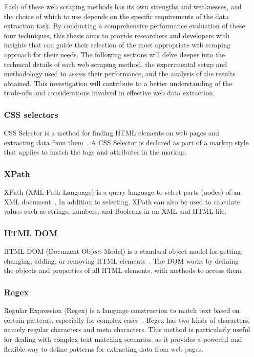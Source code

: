 Each of these web scraping methods has its own strengths and weaknesses, and the choice of which to use depends on the specific requirements of the data extraction task. By conducting a comprehensive performance evaluation of these four techniques, this thesis aims to provide researchers and developers with insights that can guide their selection of the most appropriate web scraping approach for their needs.
The following sections will delve deeper into the technical details of each web scraping method, the experimental setup and methodology used to assess their performance, and the analysis of the results obtained. This investigation will contribute to a better understanding of the trade-offs and considerations involved in effective web data extraction.
\subsubsection{CSS selectors}
CSS Selector is a method for finding HTML elements on web pages and extracting data from them~\cite{darmawan2022evaluating}. A CSS Selector is declared as part of a markup style that applies to match the tags and attributes in the markup.
\subsubsection{XPath}
XPath (XML Path Language) is a query language to select parts (nodes) of an XML document~\cite{darmawan2022evaluating}. In addition to selecting, XPath can also be used to calculate values such as strings, numbers, and Booleans in an XML and HTML file.
\subsubsection{HTML DOM}
HTML DOM (Document Object Model) is a standard object model for getting, changing, adding, or removing HTML elements~\cite{darmawan2022evaluating}. The DOM works by defining the objects and properties of all HTML elements, with methods to access them.
\subsubsection{Regex}
Regular Expression (Regex) is a language construction to match text based on certain patterns, especially for complex cases~\cite{darmawan2022evaluating}. Regex has two kinds of characters, namely regular characters and meta characters. This method is particularly useful for dealing with complex text matching scenarios, as it provides a powerful and flexible way to define patterns for extracting data from web pages.

